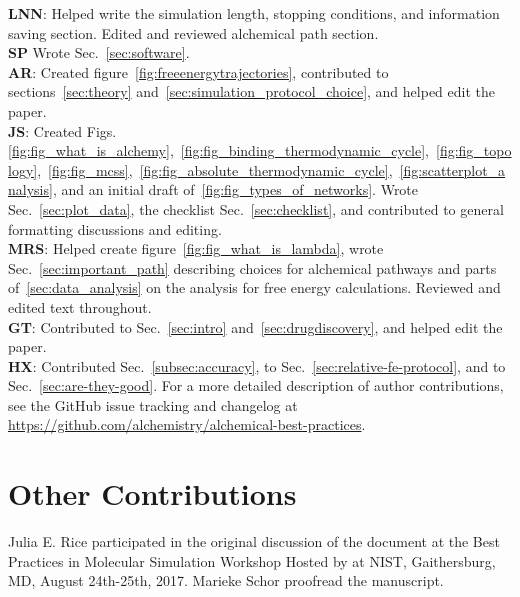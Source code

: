 \documentclass[9pt,bestpractices,pubversion]{livecoms}
\newcommand{\githubrepository}{\url{https://github.com/alchemistry/alchemical-best-practices}} %
\begin{document}
\textbf{LNN}: Helped write the simulation length, stopping conditions, and information saving section. Edited and reviewed alchemical path section.\\
\textbf{SP} Wrote Sec.~\ref{sec:software}. \\
\textbf{AR}: Created figure~\ref{fig:freeenergytrajectories}, contributed to sections~\ref{sec:theory} and~\ref{sec:simulation_protocol_choice}, and helped edit the paper.\\
\textbf{JS}: Created Figs.~ \ref{fig:fig_what_is_alchemy},~\ref{fig:fig_binding_thermodynamic_cycle},~\ref{fig:fig_topology},~\ref{fig:fig_mcss},~\ref{fig:fig_absolute_thermodynamic_cycle},~\ref{fig:scatterplot_analysis}, and an initial draft of~\ref{fig:fig_types_of_networks}. Wrote Sec.~\ref{sec:plot_data}, the checklist Sec.~\ref{sec:checklist}, and contributed to general formatting discussions and editing.\\
\textbf{MRS}: Helped create figure~\ref{fig:fig_what_is_lambda}, wrote Sec.~\ref{sec:important_path} describing choices for alchemical pathways and parts of~\ref{sec:data_analysis} on the analysis for free energy calculations. Reviewed and edited text throughout.\\
\textbf{GT}: Contributed to Sec.~\ref{sec:intro} and~\ref{sec:drugdiscovery}, and helped edit the paper.\\
\textbf{HX}: Contributed Sec.~\ref{subsec:accuracy}, to Sec.~\ref{sec:relative-fe-protocol}, and to Sec.~\ref{sec:are-they-good}.
For a more detailed description of author contributions,
see the GitHub issue tracking and changelog at \githubrepository.

\section*{Other Contributions}
%
Julia E. Rice participated in the original discussion of the document at the Best Practices in Molecular Simulation Workshop Hosted by at NIST, Gaithersburg, MD, August 24th-25th, 2017.
Marieke Schor proofread the manuscript. 
\end{document}
